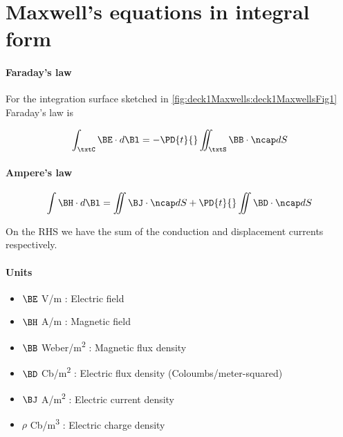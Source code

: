 %
%
\section{Maxwell's equations in integral form}
\paragraph{Faraday's law}

For the integration surface sketched in \cref{fig:deck1Maxwells:deck1MaxwellsFig1} Faraday's law is


\begin{dmath}\label{eqn:uwavesLecture1:20}
\int_\txtC \BE \cdot d\Bl = - \PD{t}{} \iint_\txtS \BB \cdot \ncap dS
\end{dmath}

\paragraph{Ampere's law}
\begin{dmath}\label{eqn:uwavesLecture1:40}
\int \BH \cdot d\Bl = \iint \BJ \cdot \ncap dS + \PD{t}{} \iint \BD \cdot \ncap dS
\end{dmath}

On the RHS we have the sum of the conduction and displacement currents respectively.

\paragraph{Units}

\begin{itemize}
\item \( \BE \) \si{V/m} : Electric field
\item \( \BH \) \si{A/m} : Magnetic field
\item \( \BB \) \si{Weber/m^2} : Magnetic flux density
\item \( \BD \) \si{Cb/m^2} : Electric flux density (Coloumbs/meter-squared)
\item \( \BJ \) \si{A/m^2} : Electric current density
\item \( \rho \) \si{Cb/m^3} : Electric charge density
\end{itemize}

